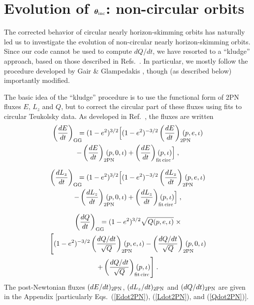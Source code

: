 \documentclass[aps,prd,twocolumn,showpacs,groupedaddress,nofootinbib]{revtex4}
\begin{document}
\section{\label{sec:iota_evolution_eccentric}Evolution of
  ${\boldsymbol \theta_{\rm inc}}$: non-circular orbits}


The corrected behavior of circular nearly horizon-skimming orbits has
naturally led us to investigate the evolution of non-circular nearly
horizon-skimming orbits.  Since our code cannot be used to compute
$dQ/dt$, we have resorted to a ``kludge'' approach, based on those
described in Refs.\ \cite{kludge_hughes,GG_kludge_fluxes}.  In
particular, we mostly follow the procedure developed by Gair \&
Glampedakis {\cite{GG_kludge_fluxes}}, though (as described below)
importantly modified.

The basic idea of the ``kludge'' procedure is to use the functional
form of 2PN fluxes $E$, $L_z$ and $Q$, but to correct the circular
part of these fluxes using fits to circular Teukolsky data.  As
developed in Ref.\ {\cite{GG_kludge_fluxes}}, the fluxes are written
\begin{multline}
\left(\frac{dE}{dt}\right)_{\rm GG}\hskip-0.25cm = (1-e^2)^{3/2}
\Big[(1-e^2)^{-3/2}\left(\frac{dE}{dt}\right)_{\rm
    2PN}\hskip-0.5cm(p,e,\iota)\\ - 
  \left(\frac{dE}{dt}\right)_{\rm 2PN}\hskip-0.5cm(p,0,\iota) +
  \left(\frac{dE}{dt}\right)_{\rm fit\, circ}\hskip-0.75cm(p,\iota) \Big]\;,
\label{EdotGG}
\end{multline}

\begin{multline}
\left(\frac{dL_z}{dt}\right)_{\rm GG}\hskip-0.25cm =
(1-e^2)^{3/2}
\Big[(1-e^2)^{-3/2}\left(\frac{dL_z}{dt}\right)_{\rm
    2PN}\hskip-0.5cm(p,e,\iota)\\ 
  -\left(\frac{dL_z}{dt}\right)_{\rm 2PN}\hskip-0.5cm(p,0,\iota) +
  \left(\frac{dL_z}{dt}\right)_{\rm fit\, circ}\hskip-0.75cm(p,\iota) \Big]\;,
\label{LdotGG}
\end{multline}

\begin{multline}
\left(\frac{dQ}{dt}\right)_{\rm GG}\hskip-0.25cm= (1-e^2)^{3/2}
\sqrt{Q(p,e,\iota)}\;\times \\
\Bigg[(1-e^2)^{-3/2}\left(\frac{dQ/dt}{\sqrt{Q}} \right)_{\rm
    2PN}\hskip-0.5cm(p,e,\iota) - 
\left(\frac{dQ/dt}{\sqrt{Q}} \right)_{\rm 2PN}\hskip-0.5cm(p,0,\iota) \\ +\left(\frac{dQ/dt}{\sqrt{Q}}
\right)_{\rm fit\, circ}\hskip-0.75cm(p,\iota) \Bigg]\;.
\label{QdotGG}
\end{multline}
The post-Newtonian fluxes $({dE}/{dt})_{\rm 2PN}$, $({dL_z}/{dt})_{\rm
2PN}$ and $({dQ}/{dt})_{\rm 2PN}$ are given in the Appendix
[particularly Eqs.\ (\ref{Edot2PN}), (\ref{Ldot2PN}), and
(\ref{Qdot2PN})].
\end{document}
